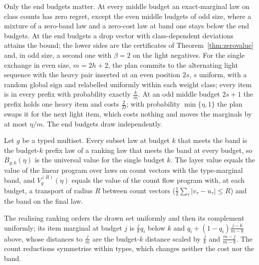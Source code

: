 Only the end budgets matter. At every middle budget an exact-marginal law on class counts has zero
regret, except the even middle budgets of odd size, where a mixture of a zero-band law and a
zero-cost law at band one stays below the end budgets. At the end budgets a drop vector with
class-dependent deviations attains the bound; the lower sides are the certificates of
Theorem~\ref{thm:zerovalue} and, in odd size, a second one with $\beta=2$ on the light negatives.
For the single exchange in even size, $m=2h+2$, the plan commits to the alternating light
sequence with the heavy pair inserted at an even position $2s$, $s$ uniform, with a random global
sign and relabelled uniformly within each weight class; every item is in every prefix with
probability exactly $\frac km$. At an odd middle budget $2s+1$ the prefix holds one heavy item and
costs $\frac2D$; with probability $\min\{\eta,1\}$ the plan swaps it for the next light item, which
costs nothing and moves the marginals by at most $\eta/m$. The end budgets draw independently.

\begin{proposition}
\label{prop:countmodel}
Let $g$ be a typed multiset. Every subset law at budget $k$ that meets the band is the budget-$k$
prefix law of a ranking law that meets the band at every budget, so $B_{g,k}(\eta)$ is the universal
value for the single budget $k$. The layer value equals the value of the linear program over laws
on count vectors with the type-marginal band, and $V^{(R)}_g(\eta)$ equals the value of the count
flow program with, at each budget, a transport of radius $R$ between count vectors
($\frac12\sum_\tau|v_\tau-u_\tau|\le R$) and the band on the final law.
\end{proposition}

The realising ranking orders the drawn set uniformly and then its complement uniformly; its item
marginal at budget $j$ is $\frac jk q_i$ below $k$ and $q_i+(1-q_i)\frac{j-k}{m-k}$ above, whose
distances to $\frac jm$ are the budget-$k$ distance scaled by $\frac jk$ and $\frac{m-j}{m-k}$. The count
reductions symmetrise within types, which changes neither the cost nor the band.

